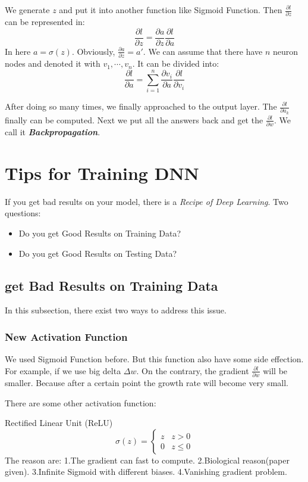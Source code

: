 \documentclass{article}
\begin{document}
We generate $z$ and put it into another function like Sigmoid Function. Then $\frac{\partial l}{\partial z}$ can be represented in:
$$
\frac{\partial l}{\partial z} = \frac{\partial a}{\partial z}\frac{\partial l}{\partial a}
$$
In here $a = \sigma(z)$. Obviously, $\frac{\partial a}{\partial z} = a'$. We can assume that there have $n$ neuron nodes and denoted it with $v_1,\cdots,v_n$. It can be divided into:
$$
\frac{\partial l}{\partial a} = \sum_{i=1}^n\frac{\partial v_i}{\partial a}\frac{\partial l}{\partial v_i}
$$

After doing so many times, we finally approached to the output layer. The $\frac{\partial l}{\partial a_k}$ finally can be computed. Next we put all the answers back and get the $\frac{\partial l}{\partial w}$. We call it \textit{\textbf{Backpropagation}}.

\section{Tips for Training DNN}

If you get bad results on your model, there is a \textit{Recipe of Deep Learning}. Two questions:
\begin{itemize}
    \item Do you get Good Results on Training Data?
    \item Do you get Good Results on Testing Data?
\end{itemize}

\subsection{get Bad Results on Training Data}

In this subsection, there exist two ways to address this issue.

\subsubsection{New Activation Function}

We used Sigmoid Function before. But this function also have some side effection. For example, if we use big delta $\Delta w$. On the contrary, the gradient $\frac{\partial l}{\partial w}$ will be smaller. Because after a certain point the growth rate will become very small.

There are some other activation function:

\begin{tipsblock}{Rectified Linear Unit (ReLU)}
        $$
        \sigma(z) = \left\{\begin{matrix}z  & z>0\\0  & z\le 0\end{matrix}\right.
        $$
        The reason are: 1.The gradient can fast to compute. 2.Biological reason(paper given). 3.Infinite Sigmoid with different biases. 4.Vanishing gradient problem.
\end{tipsblock}
\end{document}
